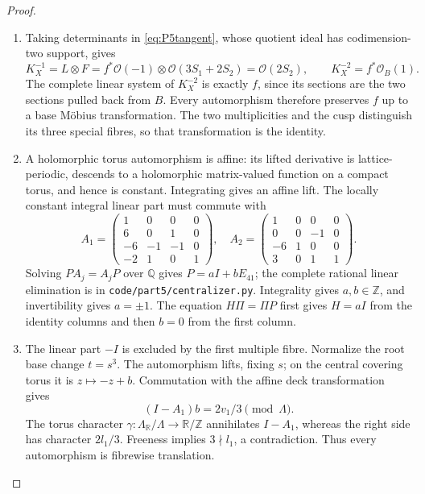 \begin{proof}
\begin{enumerate}[label=\arabic*.,leftmargin=*]
\item Taking determinants in \eqref{eq:P5tangent}, whose quotient ideal has
codimension-two support, gives
\[
 K_X^{-1}=L\otimes F
 =f^*\mathcal O(-1)\otimes\mathcal O(3S_1+2S_2)
 =\mathcal O(2S_2),\qquad K_X^{-2}=f^*\mathcal O_B(1).
\]
The complete linear system of $K_X^{-2}$ is exactly $f$, since its
sections are the two sections pulled back from $B$.  Every automorphism
therefore preserves $f$ up to a base Möbius transformation.  The two
multiplicities and the cusp distinguish its three special fibres, so
that transformation is the identity.

\item A holomorphic torus automorphism is affine: its lifted derivative is
lattice-periodic, descends to a holomorphic matrix-valued function on a
compact torus, and hence is constant.  Integrating gives an affine lift.
The locally constant integral linear part must commute with
\[
 A_1=\begin{pmatrix}1&0&0&0\\6&0&1&0\\-6&-1&-1&0\\-2&1&0&1\end{pmatrix},\quad
 A_2=\begin{pmatrix}1&0&0&0\\0&0&-1&0\\-6&1&0&0\\3&0&1&1\end{pmatrix}.
\]
Solving $PA_j=A_jP$ over $\mathbb Q$ gives
$P=aI+bE_{41}$; the complete rational linear elimination is in
\texttt{code/part5/centralizer.py}.  Integrality gives $a,b\in\mathbb Z$,
and invertibility gives $a=\pm1$.  The equation $H\Pi=\Pi P$ first gives
$H=aI$ from the identity columns and then $b=0$ from the first column.

\item The linear part $-I$ is excluded by the first multiple fibre.  Normalize
the root base change $t=s^3$.  The automorphism lifts, fixing $s$; on the
central covering torus it is $z\mapsto-z+b$.  Commutation with the affine
deck transformation gives
\[
 (I-A_1)b=2v_1/3\pmod\Lambda.
\]
The torus character $\gamma:\Lambda_{\mathbb R}/\Lambda\to\mathbb R/\mathbb Z$
annihilates $I-A_1$, whereas the right side has character $2l_1/3$.
Freeness implies $3\nmid l_1$, a contradiction.  Thus every automorphism
is fibrewise translation.


\end{enumerate}
\end{proof}
